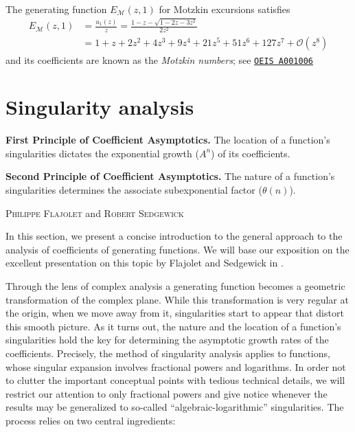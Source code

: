 \begin{corollary}
  The generating function $E_{\mathcal{M}}(z,1)$ for Motzkin excursions satisfies 
  \begin{align*}
    E_{\mathcal{M}}(z,1) &= \frac{u_1(z)}{z} = \frac{1 - z - \sqrt{1 - 2z - 3z^2}}{2z^2} \\
    &= 1 + z + 2z^{2} + 4z^{3} + 9z^{4} + 21z^{5} + 51z^{6} + 127z^{7} + \mathcal{O}(z^{8})
  \end{align*}
  and its coefficients are known as the \textit{Motzkin numbers}; see \href{https://oeis.org/A001006}{\texttt{OEIS A001006}}
\end{corollary}

\section{Singularity analysis}
\label{section:singularity_analysis}

\epigraph
{
  \textbf{First Principle of Coefficient Asymptotics.} The location of a function's singularities dictates the exponential growth ($A^n$) of its coefficients.

  \textbf{Second Principle of Coefficient Asymptotics.} The nature of a function's singularities determines the associate subexponential factor ($\theta(n)$).
}{\textsc{Philippe Flajolet} and \textsc{Robert Sedgewick} \cite[p.~227]{AnalyticCombinatorics}}

In this section, we present a concise introduction to the general approach to the analysis of coefficients of generating functions. We will base our exposition on the excellent presentation on this topic by Flajolet and Sedgewick in \cite[Chapter VI]{AnalyticCombinatorics}.

Through the lens of complex analysis a generating function becomes a geometric transformation of the complex plane. While this transformation is very regular at the origin, when we move away from it, singularities start to appear that distort this smooth picture. As it turns out, the nature and the location of a function's singularities hold the key for determining the asymptotic growth rates of the coefficients. Precisely, the method of singularity analysis applies to functions, whose singular expansion involves fractional powers and logarithms. In order not to clutter the important conceptual points with tedious technical details, we will restrict our attention to only fractional powers and give notice whenever the results may be generalized to so-called ``algebraic-logarithmic'' singularities. The process relies on two central ingredients:

